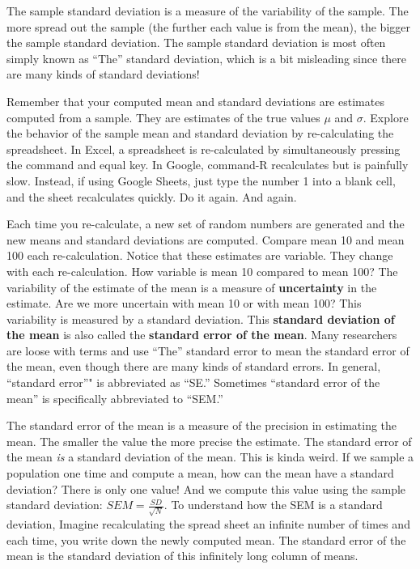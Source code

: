 \documentclass[]{book}
\begin{document}
The sample standard deviation is a measure of the variability of the sample. The more spread out the sample (the further each value is from the mean), the bigger the sample standard deviation. The sample standard deviation is most often simply known as ``The'' standard deviation, which is a bit misleading since there are many kinds of standard deviations!

Remember that your computed mean and standard deviations are estimates computed from a sample. They are estimates of the true values \(\mu\) and \(\sigma\). Explore the behavior of the sample mean and standard deviation by re-calculating the spreadsheet. In Excel, a spreadsheet is re-calculated by simultaneously pressing the command and equal key. In Google, command-R recalculates but is painfully slow. Instead, if using Google Sheets, just type the number 1 into a blank cell, and the sheet recalculates quickly. Do it again. And again.

Each time you re-calculate, a new set of random numbers are generated and the new means and standard deviations are computed. Compare mean 10 and mean 100 each re-calculation. Notice that these estimates are variable. They change with each re-calculation. How variable is mean 10 compared to mean 100? The variability of the estimate of the mean is a measure of \textbf{uncertainty} in the estimate. Are we more uncertain with mean 10 or with mean 100? This variability is measured by a standard deviation. This \textbf{standard deviation of the mean} is also called the \textbf{standard error of the mean}. Many researchers are loose with terms and use ``The'' standard error to mean the standard error of the mean, even though there are many kinds of standard errors. In general, ``standard error''" is abbreviated as ``SE.'' Sometimes ``standard error of the mean'' is specifically abbreviated to ``SEM.''

The standard error of the mean is a measure of the precision in estimating the mean. The smaller the value the more precise the estimate. The standard error of the mean \emph{is} a standard deviation of the mean. This is kinda weird. If we sample a population one time and compute a mean, how can the mean have a standard deviation? There is only one value! And we compute this value using the sample standard deviation: \(SEM = \frac{SD}{\sqrt{N}}\). To understand how the SEM is a standard deviation, Imagine recalculating the spread sheet an infinite number of times and each time, you write down the newly computed mean. The standard error of the mean is the standard deviation of this infinitely long column of means.
\end{document}
